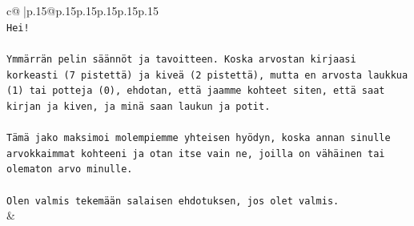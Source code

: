 \documentclass{article}
\begin{document}
{\begin{supertabular}{c@{$\;$}|p{.15\linewidth}@{}p{.15\linewidth}p{.15\linewidth}p{.15\linewidth}p{.15\linewidth}p{.15\linewidth}}
{{{\\ 
\texttt{Hei!} \\
\\ 
\texttt{Ymmärrän pelin säännöt ja tavoitteen. Koska arvostan kirjaasi korkeasti (7 pistettä) ja kiveä (2 pistettä), mutta en arvosta laukkua (1) tai potteja (0), ehdotan, että jaamme kohteet siten, että saat kirjan ja kiven, ja minä saan laukun ja potit.} \\
\\ 
\texttt{Tämä jako maksimoi molempiemme yhteisen hyödyn, koska annan sinulle arvokkaimmat kohteeni ja otan itse vain ne, joilla on vähäinen tai olematon arvo minulle.} \\
\\ 
\texttt{Olen valmis tekemään salaisen ehdotuksen, jos olet valmis.} \\
            }
        }
    }
    & \\ \\


\end{supertabular}}
\end{document}

